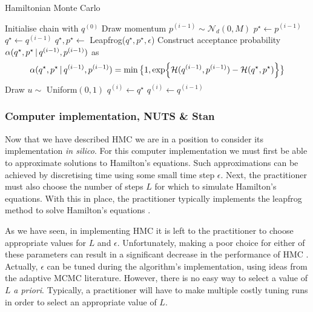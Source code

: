 \begin{algorithm}
  \caption{Hamiltonian Monte Carlo}
  \begin{algorithmic}[1]
    \State Initialise chain with $q^{(0)}$
      \State {}
      \State Draw momentum $p^{(i-1)} \sim \mathcal{N}_d(0, M)$
      \State $p^\star \leftarrow p^{(i-1)}$
      \State $q^\star \leftarrow q^{(i-1)}$
      \State {}
        \State $q^\star, p^\star \leftarrow$ Leapfrog($q^\star, p^\star, \epsilon$)
      \EndFor
      \State Construct acceptance probability $\alpha(q^\star, p^\star \,|\,
                                                q^{(i-1)}, p^{(i-1)})$ as
        \begin{equation*}
            \alpha(q^\star, p^\star \,|\, q^{(i-1)}, p^{(i-1)}) =
            \min\big\{1, \exp{\mathcal{H}(q^{(i-1)}, p^{(i-1)}) -
                           \mathcal{H}(q^\star, p^\star)}
                  \big\}
        \end{equation*}
      \State Draw $u \sim$ Uniform$(0, 1)$
        \State {}
        \State $q^{(i)} \leftarrow q^\star$
      \Else
        \State {}
        \State $q^{(i)} \leftarrow q^{(i-1)}$
      \EndIf
    \EndFor
  \end{algorithmic}
\end{algorithm}

\subsubsection{Computer implementation, NUTS \& Stan}

Now that we have described HMC we are in a position to consider its implementation
\emph{in silico}. For this computer implementation we must first be able to approximate
solutions to Hamilton's equations. Such approximations can be achieved by discretising
time using some small time step $\epsilon$. Next, the practitioner must also choose the
number of steps $L$ for which to simulate Hamilton's equations. With this in place, the
practitioner typically implements the leapfrog method to solve Hamilton's equations
\parencite{neal11}.

As we have seen, in implementing HMC it is left to the practitioner to choose appropriate
values for $L$ and $\epsilon$. Unfortunately, making a poor choice for either of these
parameters can result in a significant decrease in the performance of HMC
\parencite{hoffman14}. Actually, $\epsilon$ can be tuned during the algorithm's
implementation, using ideas from the adaptive MCMC literature. However, there is no easy
way to select a value of $L$ \emph{a priori}. Typically, a practitioner will have to make
multiple costly tuning runs in order to select an appropriate value of $L$.

